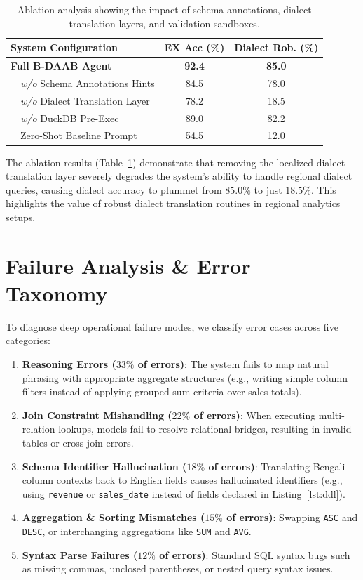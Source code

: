 \documentclass[11pt,a4paper]{article}
\begin{document}
\begin{table}[h]
\centering
\small
\begin{tabular}{lcc}
\toprule
\textbf{System Configuration} & \textbf{EX Acc (\%)} & \textbf{Dialect Rob. (\%)} \\
\midrule
\textbf{Full B-DAAB Agent} & \textbf{92.4} & \textbf{85.0} \\
~~\textit{w/o} Schema Annotations Hints & 84.5 & 78.0 \\
~~\textit{w/o} Dialect Translation Layer & 78.2 & 18.5 \\
~~\textit{w/o} DuckDB Pre-Exec & 89.0 & 82.2 \\
~~Zero-Shot Baseline Prompt & 54.5 & 12.0 \\
\bottomrule
\end{tabular}
\caption{Ablation analysis showing the impact of schema annotations, dialect translation layers, and validation sandboxes.}
\label{tab:ablation}
\end{table}

The ablation results (Table~\ref{tab:ablation}) demonstrate that removing the localized dialect translation layer severely degrades the system's ability to handle regional dialect queries, causing dialect accuracy to plummet from $85.0\%$ to just $18.5\%$. This highlights the value of robust dialect translation routines in regional analytics setups.

\section{Failure Analysis & Error Taxonomy}
To diagnose deep operational failure modes, we classify error cases across five categories:
\begin{enumerate}
    \item \textbf{Reasoning Errors ($33\%$ of errors)}: The system fails to map natural phrasing with appropriate aggregate structures (e.g., writing simple column filters instead of applying grouped sum criteria over sales totals).
    \item \textbf{Join Constraint Mishandling ($22\%$ of errors)}: When executing multi-relation lookups, models fail to resolve relational bridges, resulting in invalid tables or cross-join errors.
    \item \textbf{Schema Identifier Hallucination ($18\%$ of errors)}: Translating Bengali column contexts back to English fields causes hallucinated identifiers (e.g., using \texttt{revenue} or \texttt{sales_date} instead of fields declared in Listing~\ref{lst:ddl}).
    \item \textbf{Aggregation & Sorting Mismatches ($15\%$ of errors)}: Swapping \texttt{ASC} and \texttt{DESC}, or interchanging aggregations like \texttt{SUM} and \texttt{AVG}.
    \item \textbf{Syntax Parse Failures ($12\%$ of errors)}: Standard SQL syntax bugs such as missing commas, unclosed parentheses, or nested query syntax issues.
\end{enumerate}
\end{document}
